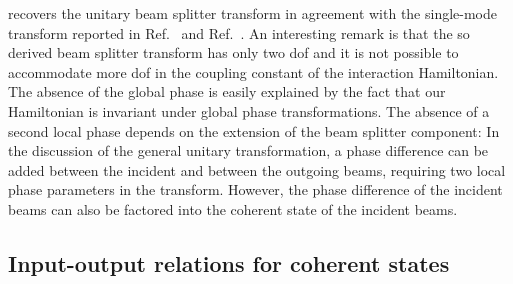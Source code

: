 recovers the unitary beam splitter transform in agreement with the single-mode transform reported in Ref.~\cite[p.~96]{Leonhardt2003} and Ref.~\cite[p.~130]{Haroche2006}.
An interesting remark is that the so derived beam splitter transform has only two \gls{dof} and it is not possible to accommodate more \gls{dof} in the coupling constant of the interaction Hamiltonian.
The absence of the global phase is easily explained by the fact that our Hamiltonian is invariant under global phase transformations.
The absence of a second local phase depends on the extension of the beam splitter component:
In the discussion of the general unitary transformation, a phase difference can be added between the incident and between the outgoing beams, requiring two local phase parameters in the transform.
However, the phase difference of the incident beams can also be factored into the coherent state of the incident beams.

\FloatBarrier
\subsection{Input-output relations for coherent states}


